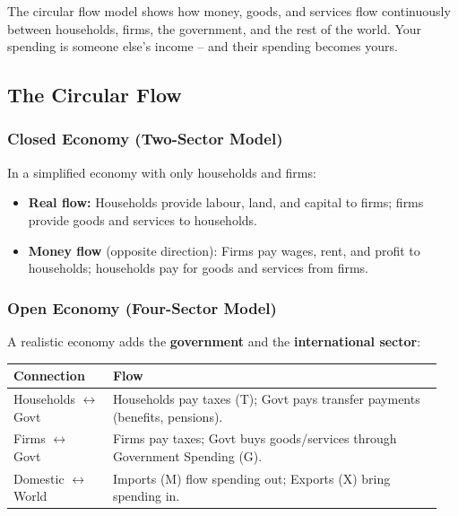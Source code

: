 \documentclass[11pt, a4paper, twoside]{book}
\begin{document}
\begin{coreidea}
The circular flow model shows how money, goods, and services flow continuously between households, firms, the government, and the rest of the world. Your spending is someone else's income -- and their spending becomes yours.
\end{coreidea}

\subsection{The Circular Flow}

\subsubsection{Closed Economy (Two-Sector Model)}

In a simplified economy with only households and firms:
\begin{itemize}
  \item \textbf{Real flow:} Households provide labour, land, and capital to firms; firms provide goods and services to households.
  \item \textbf{Money flow} (opposite direction): Firms pay wages, rent, and profit to households; households pay for goods and services from firms.
\end{itemize}

\subsubsection{Open Economy (Four-Sector Model)}

A realistic economy adds the \textbf{government} and the \textbf{international sector}:

\begin{tcolorbox}[enhanced,colback=LightBlue,colframe=MidBlue!70,arc=0pt,boxrule=0.8pt]
\begin{tabular}{@{}>{\RaggedRight\arraybackslash}p{0.22\linewidth}>{\RaggedRight\arraybackslash}p{0.73\linewidth}@{}}
\textbf{\color{NavyPrimary}Connection} & \textbf{\color{NavyPrimary}Flow} \\
\midrule
Households $\leftrightarrow$ Govt & Households pay taxes (T); Govt pays transfer payments (benefits, pensions). \\
Firms $\leftrightarrow$ Govt & Firms pay taxes; Govt buys goods/services through Government Spending (G). \\
Domestic $\leftrightarrow$ World & Imports (M) flow spending out; Exports (X) bring spending in. \\
\end{tabular}
\end{tcolorbox}
\end{document}
